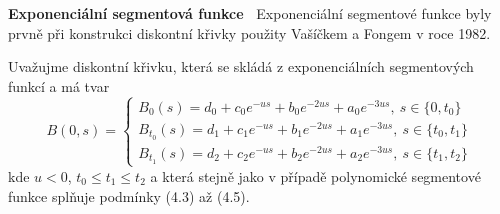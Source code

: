 \documentclass[a4paper]{book}
\begin{document}
\noindent \textbf{Exponenciální segmentová funkce~} Exponenciální segmentové funkce byly prvně při konstrukci diskontní křivky použity Vašíčkem a Fongem v roce 1982.

Uvažujme diskontní křivku, která se skládá z exponenciálních segmentových funkcí a má tvar
\begin{equation}
B(0,s) =
\begin{cases}
B_{0}(s) = d_0 + c_0e^{-us} + b_0e^{-2us} + a_0e^{-3us}, ~ s \in \{0,t_0\}\\
B_{t_0}(s) = d_1 + c_1e^{-us} + b_1e^{-2us} + a_1e^{-3us}, ~ s \in \{t_0,t_1\}\\
B_{t_1}(s) = d_2 + c_2e^{-us} + b_2e^{-2us} + a_2e^{-3us}, ~ s \in \{t_1,t_2\}
\end{cases}
\end{equation}
kde $u < 0$, $t_0 \le t_1 \le t_2$ a která stejně jako v případě polynomické segmentové funkce splňuje podmínky (4.3) až (4.5).
\end{document}
